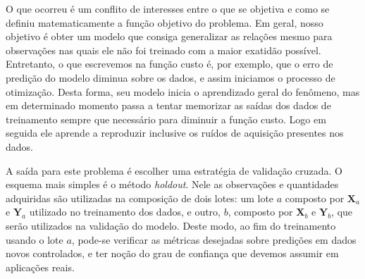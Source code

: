       O que ocorreu é um conflito de interesses entre o que se objetiva e como se definiu matematicamente a função objetivo do problema. Em geral, nosso objetivo é obter um modelo que consiga generalizar as relações \DIFdelbegin {}\DIFdelend \DIFaddbegin {}\DIFaddend mesmo para observações nas quais ele não foi treinado com a maior exatidão possível. Entretanto, o que escrevemos na função custo é, por exemplo, que o erro de predição do modelo diminua sobre os dados, e assim iniciamos o processo de otimização. Desta forma, seu modelo inicia o aprendizado geral do fenômeno, mas em determinado momento passa a tentar memorizar as saídas dos dados de treinamento sempre que necessário para diminuir a função custo. Logo em seguida ele aprende a reproduzir inclusive os ruídos de aquisição presentes nos dados.

      A saída para este problema é escolher uma estratégia de validação cruzada. O esquema mais simples é o método \textit{holdout}. Nele as observações e quantidades adquiridas são utilizadas na composição de dois lotes: um lote $a$ composto por $\boldsymbol{X}_a$ e $\boldsymbol{Y}_a$ utilizado no treinamento dos dados, e outro, $b$, composto por $\boldsymbol{X}_b$ e $\boldsymbol{Y}_b$, que serão utilizados na validação do modelo\DIFdelbegin {}\DIFdelend . Deste modo, ao fim do treinamento usando o lote $a$, pode-se verificar as métricas desejadas sobre predições em dados novos controlados, e ter noção do grau de confiança que devemos assumir em \DIFdelbegin {}\DIFdelend aplicações reais.

